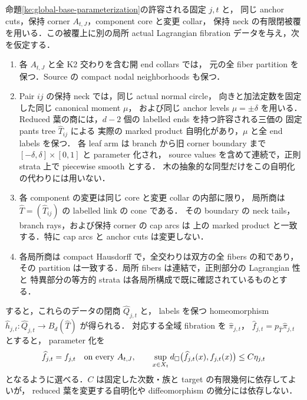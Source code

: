 \begin{proposition}
\label{ke:moment-relative-replacement}
命題\ref{ke:global-base-parameterization}の許容される固定 $j,t$ と，
同じ anchor cuts，保持 corner $A_{t,J}$，component core と変更 collar，
保持 neck の有限閉被覆を用いる．この被覆上に別の局所 actual Lagrangian
fibration データを与え，次を仮定する．
\begin{enumerate}
\item 各 $A_{t,J}$ と全 K2 交わりを含む開 end collars では，
元の全 fiber partition を保つ．Source の compact nodal neighborhoods も保つ．
\item Pair $ij$ の保持 neck では，同じ actual normal circle，
向きと加法定数を固定した同じ canonical moment $\mu$，
および同じ anchor levels $\mu=\pm\delta$ を用いる．
Reduced 葉の商には，$d-2$ 個の labelled ends を持つ許容される三価の
固定 pants tree $\widehat T_{ij}$ による
実際の marked product 自明化があり，$\mu$ と全 end labels を保つ．
各 leaf arm は branch から旧 corner boundary まで
$[-\delta,\delta]\times[0,1]$ と parameter 化され，
source values を含めて連続で，正則 strata 上で piecewise smooth とする．
木の抽象的な同型だけをこの自明化の代わりには用いない．
\item 各 component の変更は同じ core と変更 collar の内部に限り，
局所商は $\widehat T=(\widehat T_{ij})$ の labelled link の cone である．
その boundary の neck tails，branch rays，および保持 corner の cap arcs は
上の marked product と一致する．特に cap arcs と anchor cuts は変更しない．
\item 各局所商は compact Hausdorff で，全交わりは双方の全 fibers の和であり，
その partition は一致する．局所 fibers は連結で，正則部分の Lagrangian 性と
特異部分の等方的 strata は各局所構成で既に確認されているものとする．
\end{enumerate}
すると，これらのデータの閉商 $\widehat Q_{j,t}$ と，
labels を保つ homeomorphism
$\widehat h_{j,t}:\widehat Q_{j,t}\to B_d(\widehat T)$ が得られる．
対応する全域 fibration を $\widehat\pi_{j,t}$，
$\widehat f_{j,t}=p_{\widehat T}\widehat\pi_{j,t}$ とすると，
parameter 化を
\begin{equation}\label{ke:eq:relative-replacement-value}
 \widehat f_{j,t}=f_{j,t}\quad\hbox{on every }A_{t,J},\qquad
 \sup_{x\in X_t}d_\square
       \bigl(\widehat f_{j,t}(x),f_{j,t}(x)\bigr)
 \le C\eta_{j,t}
\end{equation}
となるように選べる．$C$ は固定した次数・族と target の有限幾何に依存してよいが，
reduced 葉を変更する自明化や diffeomorphism の微分には依存しない．
\end{proposition}


